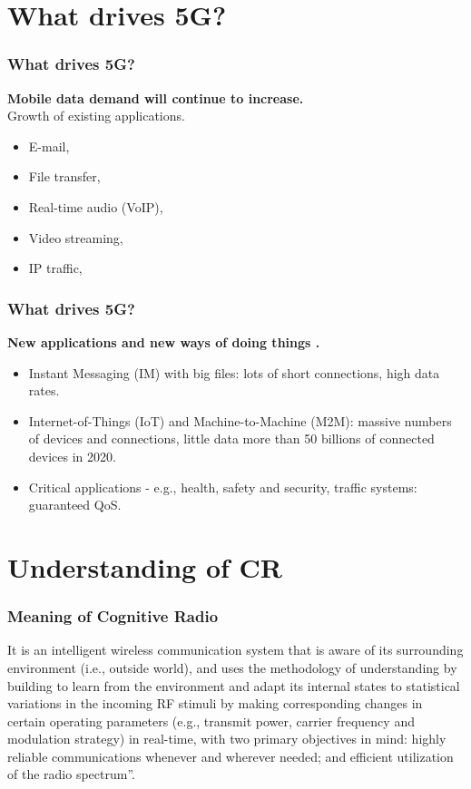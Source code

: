 \documentclass{beamer}
\begin{document}
\section{What drives 5G?}
\begin{frame}
\frametitle{What drives 5G?}

\textbf{Mobile data demand will continue to increase.}\\

Growth of existing applications.\\
\begin{itemize}
\item E-mail,\\ 
\item File transfer,\\ 
\item Real-time audio (VoIP),\\ 
\item Video streaming,\\
\item IP traffic,\\ 
\end{itemize}
\end{frame}

\begin{frame}
\frametitle{What drives 5G?}


\textbf{New applications and new ways of doing things
.}\\

\begin{itemize}
\item Instant Messaging (IM) with big files: lots of short connections, high data rates.\\
\item Internet-of-Things (IoT) and Machine-to-Machine (M2M): massive numbers of devices and connections, little data more than 50 billions of connected devices in 2020.\\
\item Critical applications - e.g., health, safety and security, traffic systems: guaranteed QoS.

\end{itemize}
\end{frame}

\section{Understanding of CR}
\begin{frame}
\frametitle{Meaning of Cognitive Radio}

It is an intelligent wireless communication system that is aware of its surrounding environment (i.e., outside world), and uses the methodology of understanding by building to learn from the environment and adapt its internal states to statistical variations in the incoming RF stimuli by making corresponding changes in certain operating parameters (e.g., transmit power, carrier frequency and modulation strategy) in real-time, with two primary objectives in mind: highly reliable communications whenever and wherever needed; and efficient utilization of the radio spectrum”.
\end{frame}
\end{document}
